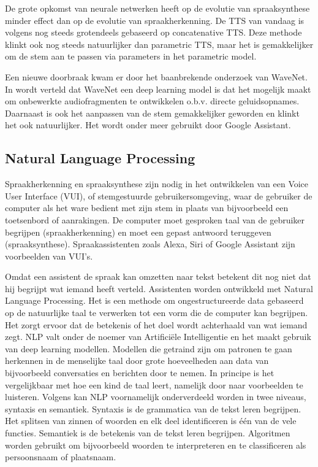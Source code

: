 De grote opkomst van neurale netwerken heeft op de evolutie van spraaksynthese minder effect dan op de evolutie van spraakherkenning. De \gls{TTS} van vandaag is volgens \autocite{Oord2016} nog steeds grotendeels gebaseerd op concatenative \gls{TTS}. Deze methode klinkt ook nog steeds natuurlijker dan parametric \gls{TTS}, maar het is gemakkelijker om de stem aan te passen via parameters in het parametric model.

Een nieuwe doorbraak kwam er door het baanbrekende onderzoek van WaveNet. In \autocite{Singh} wordt verteld dat WaveNet een deep learning model is dat het mogelijk maakt om onbewerkte audiofragmenten te ontwikkelen o.b.v. directe geluidsopnames. Daarnaast is ook het aanpassen van de stem gemakkelijker geworden en klinkt het ook natuurlijker. Het wordt onder meer gebruikt door Google Assistant.
 
\subsection{Natural Language Processing}

Spraakherkenning en spraaksynthese zijn nodig in het ontwikkelen van een Voice User Interface (VUI), of stemgestuurde gebruikersomgeving, waar de gebruiker de computer als het ware bedient met zijn stem in plaats van bijvoorbeeld een toetsenbord of aanrakingen. De computer moet gesproken taal van de gebruiker begrijpen (spraakherkenning) en moet een gepast antwoord teruggeven (spraaksynthese). Spraakassistenten zoals Alexa, Siri of Google Assistant zijn voorbeelden van VUI's.

Omdat een assistent de spraak kan omzetten naar tekst betekent dit nog niet dat hij begrijpt wat iemand heeft verteld. Assistenten worden ontwikkeld met Natural Language Processing. Het is een methode om ongestructureerde data gebaseerd op de natuurlijke taal te verwerken tot een vorm die de computer kan begrijpen. Het zorgt ervoor dat de betekenis of het doel wordt achterhaald van wat iemand zegt. \gls{NLP} valt onder de noemer van Artificiële Intelligentie en het maakt gebruik van deep learning modellen. Modellen die getraind zijn om patronen te gaan herkennen in de menselijke taal door grote hoeveelheden aan data van bijvoorbeeld conversaties en berichten door te nemen. In principe is het vergelijkbaar met hoe een kind de taal leert, namelijk door naar voorbeelden te luisteren. \autocite{Rouse2017}
Volgens \autocite{Garbade2018} kan \gls{NLP} voornamelijk onderverdeeld worden in twee niveaus, syntaxis en semantiek. Syntaxis is de grammatica van de tekst leren begrijpen. Het splitsen van zinnen of woorden en elk deel identificeren is één van de vele functies. Semantiek is de betekenis van de tekst leren begrijpen. Algoritmen worden gebruikt om bijvoorbeeld woorden te interpreteren en te classificeren als persoonsnaam of plaatsnaam.

